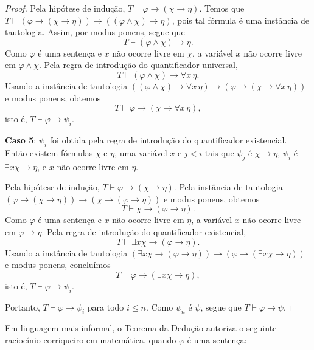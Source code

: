 \begin{proof}
    Pela hipótese de indução, $T\vdash \varphi\rightarrow(\chi\rightarrow\eta)$.
    Temos que $T\vdash (\varphi\rightarrow(\chi\rightarrow\eta))\rightarrow((\varphi\land\chi)\rightarrow\eta)$, pois tal fórmula é uma instância de tautologia.
    Assim, por modus ponens, segue que
    \[
        T\vdash (\varphi\land\chi)\rightarrow\eta.
    \]
    Como $\varphi$ é uma sentença e $x$ não ocorre livre em $\chi$, a variável $x$ não ocorre livre em $\varphi\land\chi$.
    Pela regra de introdução do quantificador universal,
    \[
        T\vdash (\varphi\land\chi)\rightarrow\forall x\,\eta.
    \]
    Usando a instância de tautologia $((\varphi\land\chi)\rightarrow\forall x\,\eta)
        \rightarrow
        (\varphi\rightarrow(\chi\rightarrow\forall x\,\eta))$ e modus ponens, obtemos
    \[
        T\vdash \varphi\rightarrow(\chi\rightarrow\forall x\,\eta),
    \]
    isto é, $T\vdash \varphi\rightarrow\psi_i$.

    \textbf{Caso 5}: $\psi_i$ foi obtida pela regra de introdução do quantificador existencial.
    Então existem fórmulas $\chi$ e $\eta$, uma variável $x$ e $j<i$ tais que $\psi_j$ é $\chi\rightarrow\eta$, $\psi_i$ é $\exists x\chi\rightarrow\eta$, e $x$ não ocorre livre em $\eta$.

    Pela hipótese de indução, $T\vdash \varphi\rightarrow(\chi\rightarrow\eta)$.
    Pela instância de tautologia $(\varphi\rightarrow(\chi\rightarrow\eta))\rightarrow(\chi\rightarrow(\varphi\rightarrow\eta))$ e modus ponens, obtemos
    \[
        T\vdash \chi\rightarrow(\varphi\rightarrow\eta).
    \]
    Como $\varphi$ é uma sentença e $x$ não ocorre livre em $\eta$, a variável $x$ não ocorre livre em $\varphi\rightarrow\eta$.
    Pela regra de introdução do quantificador existencial,
    \[
        T\vdash \exists x\chi\rightarrow(\varphi\rightarrow\eta).
    \]
    Usando a instância de tautologia $(\exists x\chi\rightarrow(\varphi\rightarrow\eta))
        \rightarrow
        (\varphi\rightarrow(\exists x\chi\rightarrow\eta))$ e modus ponens, concluímos
    \[
        T\vdash \varphi\rightarrow(\exists x\chi\rightarrow\eta),
    \]
    isto é, $T\vdash \varphi\rightarrow\psi_i$.

    Portanto, $T\vdash \varphi\rightarrow\psi_i$ para todo $i\leq n$.
    Como $\psi_n$ é $\psi$, segue que $T\vdash \varphi\rightarrow\psi$.
\end{proof}

Em linguagem mais informal, o Teorema da Dedução autoriza o seguinte raciocínio corriqueiro em matemática, quando $\varphi$ é uma sentença:

